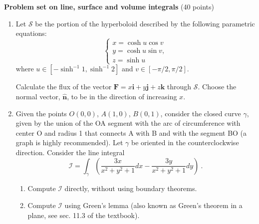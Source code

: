 \documentclass[fleqn]{article}
\begin{document}
  \pagebreak
  
  \textbf{Problem set on line, surface and volume integrals} (40 points)
  \begin{enumerate}

    \item Let ${\mathcal S}$ be the portion of the hyperboloid 
    described by the following parametric equations:
    \begin{equation} 
      \begin{cases} 
      x = \cosh u \cos v  \nonumber \\
      y = \cosh u \sin v,  \nonumber \\
      z = \sinh u  \nonumber 
      \end{cases}
    \end{equation} 
    where $u \in \left[-\sinh^{-1} 1, \sinh^{-1} 2 \right]$ and $v \in \left[-\pi/2, \pi/2 \right]$. 
    
    Calculate the flux of the vector $\mathbf{F} = x\mathbf{i }+ y\mathbf{j }+ z\mathbf{k}$ through ${\mathcal S}$. Choose the normal vector, $\mathbf{\hat{n}}$, to be in the direction of increasing $x$.
    
    \item Given the points $O (0, 0)$, $A (1, 0)$, $B (0, 1)$, consider the closed curve $\gamma$, given by the union of the OA segment
    with the arc of circumference with center O and radius 1 that connects A with B and with the segment BO (a graph is highly recommended). Let $\gamma$ be oriented in the 
    counterclockwise direction. Consider the line integral
    $${\mathcal I} = \int_{\gamma} \left(\frac{3x}{x^2 + y^2 +1} dx-\frac{3y}{x^2 + y^2 +1} dy
       \right)~.
       $$
      \begin{enumerate}
        \item Compute  ${\mathcal I}$ directly, without using boundary theorems. 
        
        \item Compute  ${\mathcal I}$ using Green's lemma (also known as Green's theorem in a plane, see sec. 11.3 of the textbook). 
      \end{enumerate}
    

\end{enumerate}
\end{document}
